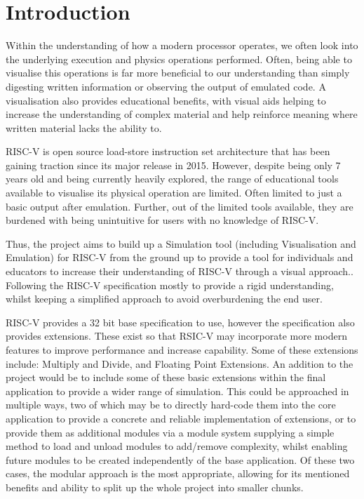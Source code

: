 \chapter{Introduction}
\label{ch:introduction}
Within the understanding of how a modern processor operates, we often look into the underlying execution and physics operations performed. Often, being able to visualise this operations is far more beneficial to our understanding than simply digesting written information or observing the output of emulated code. A visualisation also provides educational benefits, with visual aids helping to increase the understanding of complex material and help reinforce meaning where written material lacks the ability to.

RISC-V \cite{waterman_2019_the} is open source load-store instruction set architecture that has been gaining traction since its major release in 2015. However, despite being only 7 years old and being currently heavily explored, the range of educational tools available to visualise its physical operation are limited. Often limited to just a basic output after emulation. Further, out of the limited tools available, they are burdened with being unintuitive for users with no knowledge of RISC-V.

Thus, the project aims to build up a Simulation tool (including Visualisation and Emulation) for RISC-V from the ground up to provide a tool for individuals and educators to increase their understanding of RISC-V through a visual approach.. Following the RISC-V specification \cite{waterman_2011_the} mostly to provide a rigid understanding, whilst keeping a simplified approach to avoid overburdening the end user.

RISC-V provides a 32 bit base specification to use, however the specification also provides extensions. These exist so that RSIC-V may incorporate more modern features to improve performance and increase capability. Some of these extensions include: Multiply and Divide, and Floating Point Extensions. An addition to the project would be to include some of these basic extensions within the final application to provide a wider range of simulation. This could be approached in multiple ways, two of which may be to directly hard-code them into the core application to provide a concrete and reliable implementation of extensions, or to provide them as additional modules via a module system supplying a simple method to load and unload modules to add/remove complexity, whilst enabling future modules to be created independently of the base application. Of these two cases, the modular approach is the most appropriate, allowing for its mentioned benefits and ability to split up the whole project into smaller chunks.

